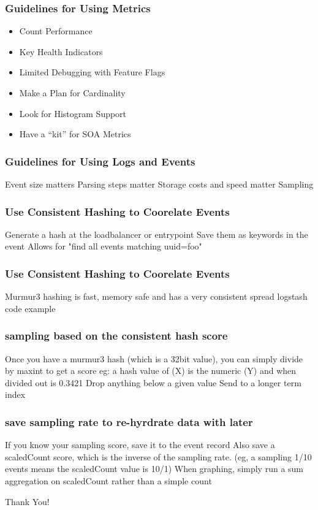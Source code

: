 \begin{frame}
    \frametitle{Guidelines for Using Metrics}

    \begin{itemize}
        \item Count Performance
        \item Key Health Indicators
        \item Limited Debugging with Feature Flags
        \item Make a Plan for Cardinality
        \item Look for Histogram Support
        \item Have a ``kit'' for SOA Metrics
    \end{itemize}
\end{frame}

\begin{frame}
    \frametitle{Guidelines for Using Logs and Events}
    Event size matters
    Parsing steps matter
    Storage costs and speed matter
    Sampling
\end{frame}

\begin{frame}
    \frametitle{Use Consistent Hashing to Coorelate Events}
    Generate a hash at the loadbalancer or entrypoint
    Save them as keywords in the event
    Allows for "find all events matching uuid=foo"
\end{frame}

\begin{frame}
    \frametitle{Use Consistent Hashing to Coorelate Events}
    Murmur3 hashing is fast, memory safe and has a very consistent spread
    logstash code example
\end{frame}

\begin{frame}
    \frametitle{sampling based on the consistent hash score}
    Once you have a murmur3 hash (which is a 32bit value), you can simply divide by maxint to get a score
    eg: a hash value of (X) is the numeric (Y) and when divided out is 0.3421
    Drop anything below a given value
    Send to a longer term index
\end{frame}

\begin{frame}
    \frametitle{save sampling rate to re-hyrdrate data with later}
    If you know your sampling score, save it to the event record
    Also save a scaledCount score, which is the inverse of the sampling rate. (eg, a sampling 1/10 events means the scaledCount value is 10/1)
    When graphing, simply run a sum aggregation on scaledCount rather than a simple count
\end{frame}


    




\begin{frame}[standout]
    Thank You!
\end{frame}

\appendix


